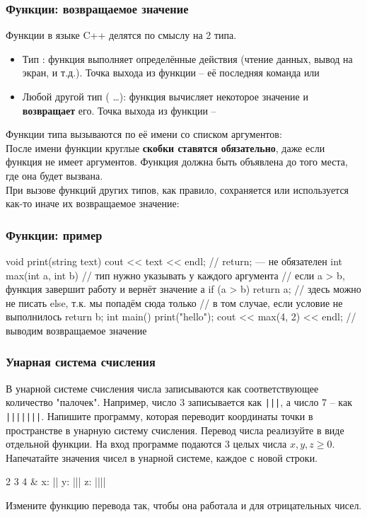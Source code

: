 \begin{frame}
	\frametitle{Функции: возвращаемое значение}
	Функции в языке C++ делятся по смыслу на 2 типа.
	\begin{itemize}
		\item Тип : функция выполняет определённые действия (чтение
			данных, вывод на экран, и т.д.). Точка выхода из функции -- её последняя
			команда или 
		\item Любой другой тип ( \dots): функция вычисляет
			некоторое значение и {\bf возвращает} его. Точка выхода из функции --
	\end{itemize}
	Функции типа  вызываются по её имени со списком аргументов:
	\\
	После имени функции круглые {\bf скобки ставятся обязательно}, даже если
	функция не имеет аргументов. Функция должна быть объявлена до того места, где
	она будет вызвана. \\

	При вызове функций других типов, как правило, сохраняется или используется
	как-то иначе их возвращаемое значение: \\
\end{frame}

\begin{frame}[fragile]
	\frametitle{Функции: пример}
	\begin{code}
void print(string text)
{
	cout << text << endl;
	// return; — не обязателен
}
int max(int a, int b) // тип нужно указывать у каждого аргумента
{
	// если a > b, функция завершит работу и вернёт значение а
	if (a > b) return a;
	// здесь можно не писать else, т.к. мы попадём сюда только
	// в том случае, если условие не выполнилось
	return b;
}
int main()
{
	print("hello");
	cout << max(4, 2) << endl; // выводим возвращаемое значение
}
	\end{code}
\end{frame}

\begin{frame}
	\frametitle{Унарная система счисления}
В унарной системе счисления числа записываются как соответствующее
	количество "палочек". Например, число 3 записывается как {\tt |||}, а число 7 – как
	{\tt |||||||}. Напишите программу, которая переводит координаты точки в пространстве
	в унарную систему счисления. Перевод числа реализуйте в виде отдельной
	функции.
	\inp
	На вход программе подаются 3 целых числа $x, y, z \geq 0$. 
	\out
	Напечатайте значения чисел в унарной системе, каждое с новой строки.
	\begin{ex}
		2 3 4 & x: || \newline y: ||| \newline z: |||| \tb
	\end{ex}
	{\bf *}Измените функцию перевода так, чтобы она работала и для отрицательных
	чисел.
\end{frame}

